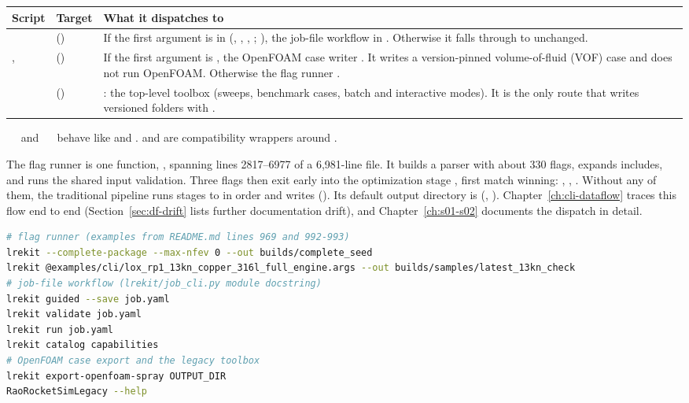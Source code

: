 {\small
\begin{longtable}{P{3.4cm}P{3.4cm}P{8.6cm}}
\toprule
Script & Target & What it dispatches to \\
\midrule
\endhead
{} &  () & If the first argument is in  (, , , ; ), the job-file workflow in . Otherwise it falls through to  unchanged. \\
,  &  () & If the first argument is , the OpenFOAM case writer . It writes a version-pinned volume-of-fluid (VOF) case and does not run OpenFOAM. Otherwise the flag runner . \\
 &  () & : the top-level  toolbox (sweeps, benchmark cases, batch and interactive modes). It is the only route that writes versioned  folders with . \\
\bottomrule
\end{longtable}}

~~ and ~~ behave like  and .  and  are compatibility wrappers around .

The flag runner is one function, , spanning lines 2817--6977 of a 6,981-line file. It builds a parser with about 330 flags, expands  includes, and runs the shared input validation. Three flags then exit early into the optimization stage , first match winning: , , . Without any of them, the traditional pipeline runs stages  to  in order and writes  (). Its default output directory is  (, ). Chapter~\ref{ch:cli-dataflow} traces this flow end to end (Section~\ref{sec:df-drift} lists further documentation drift), and Chapter~\ref{ch:s01-s02} documents the dispatch in detail.

\begin{lstlisting}[language=bash]
# flag runner (examples from README.md lines 969 and 992-993)
lrekit --complete-package --max-nfev 0 --out builds/complete_seed
lrekit @examples/cli/lox_rp1_13kn_copper_316l_full_engine.args --out builds/samples/latest_13kn_check
# job-file workflow (lrekit/job_cli.py module docstring)
lrekit guided --save job.yaml
lrekit validate job.yaml
lrekit run job.yaml
lrekit catalog capabilities
# OpenFOAM case export and the legacy toolbox
lrekit export-openfoam-spray OUTPUT_DIR
RaoRocketSimLegacy --help
\end{lstlisting}

